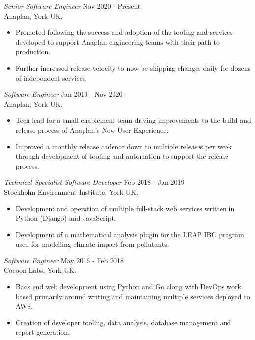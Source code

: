 \documentclass[a4paper, margin, oneside]{res}
\begin{document}
\begin{resume}
{\sl Senior Software Engineer} \hfill Nov 2020 - Present  \\
Anaplan, York UK.
\begin{itemize}  \itemsep -2pt %
  \item Promoted following the success and adoption of the tooling and
        services developed to support Anaplan engineering teams with
        their path to production.
  \item Further increased release velocity to now be shipping changes
        daily for dozens of independent services.
\end{itemize}

{\sl Software Engineer} \hfill Jan 2019 - Nov 2020 \\
Anaplan, York UK.
\begin{itemize}  \itemsep -2pt %
  \item Tech lead for a small enablement team driving improvements to
        the build and release process of Anaplan's New User Experience.
  \item Improved a monthly release cadence down to multiple releases per
        week through development of tooling and automation to support the
        release process.
\end{itemize}

{\sl Technical Specialist Software Developer} \hfill Feb 2018 - Jan 2019 \\
Stockholm Environment Institute, York UK.
\begin{itemize}  \itemsep -2pt %
  \item Development and operation of multiple full-stack web services written
        in Python (Django) and JavaScript.
  \item Development of a mathematical analysis plugin for the LEAP IBC program
        used for modelling climate impact from pollutants.
\end{itemize}

{\sl Software Engineer} \hfill May 2016 - Feb 2018 \\
Cocoon Labs, York UK.
\begin{itemize}  \itemsep -2pt %
  \item Back end web development using Python and Go along with DevOps work based
        primarily around writing and maintaining multiple services deployed to AWS.
  \item Creation of developer tooling, data analysis, database management and
        report generation.
\end{itemize}




\end{resume}
\end{document}
